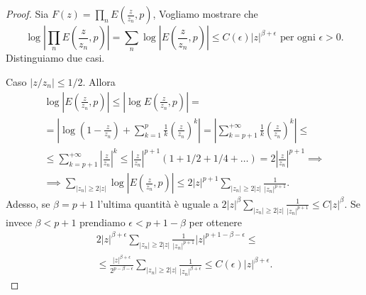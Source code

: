 \begin{proof}
  Sia $\displaystyle F(z)=\prod_nE\left(\frac{z}{z_n},p\right)$, Vogliamo mostrare che
  $$\log\left|\prod_nE\left(\frac{z}{z_n},p\right)\right|=\sum_n\log\left|E\left(\frac{z}{z_n},p\right)\right| \le C(\epsilon)|z|^{\beta+\epsilon} \text{ per ogni } \epsilon>0.$$
  Distinguiamo due casi.

  Caso $|z/z_n| \le 1/2$. Allora
  \begin{gather*}
    \log\left|E\left(\frac{z}{z_n},p\right)\right| \le \left|\log{E\left(\frac{z}{z_n},p\right)}\right|= \\
    =\left|\log\left(1-\frac{z}{z_n}\right)+\sum_{k=1}^p \frac{1}{k}\left(\frac{z}{z_n}\right)^k\right|=\left|\sum_{k=p+1}^{+\infty} \frac{1}{k} \left(\frac{z}{z_n}\right)^k\right| \le \\
    \le \sum_{k=p+1}^{+\infty} \left|\frac{z}{z_n}\right|^k \le \left|\frac{z}{z_n}\right|^{p+1}(1+1/2+1/4+\dots)=2\left|\frac{z}{z_n}\right|^{p+1} \implies \\
    \implies \sum_{|z_n| \ge 2|z|} \log\left|E\left(\frac{z}{z_n},p\right)\right| \le 2|z|^{p+1} \sum_{|z_n| \ge 2|z|} \frac{1}{|z_n|^{p+1}}.
  \end{gather*}
  Adesso, se $\beta=p+1$ l'ultima quantità è uguale a $\displaystyle 2|z|^{\beta}\sum_{|z_n| \ge 2|z|} \frac{1}{|z_n|^{p+1}} \le C|z|^{\beta}$. Se invece $\beta<p+1$ prendiamo $\epsilon<p+1-\beta$ per ottenere
  \begin{gather*}
    2|z|^{\beta+\epsilon}\sum_{|z_n| \ge 2|z|} \frac{1}{|z_n|^{p+1}}|z|^{p+1-\beta-\epsilon} \le \\
    \le \frac{|z|^{\beta+\epsilon}}{2^{p-\beta-\epsilon}}\sum_{|z_n| \ge 2|z|} \frac{1}{|z_n|^{\beta+\epsilon}} \le C(\epsilon)|z|^{\beta+\epsilon}.
  \end{gather*}


\end{proof}
